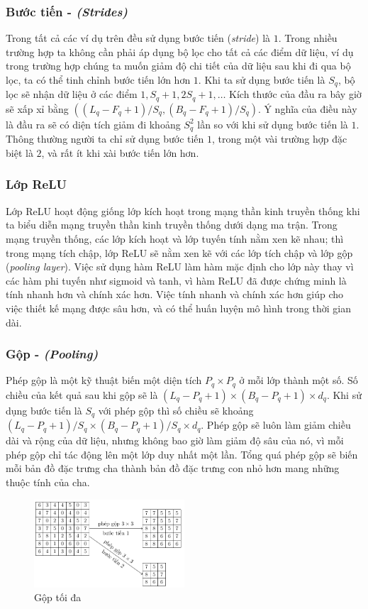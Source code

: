 \subsubsection{Bước tiến - \textit{(Strides)}}
Trong tất cả các ví dụ trên đều sử dụng bước tiến (\textit{stride}) là $1$. Trong nhiều trường hợp ta không cần phải áp dụng bộ lọc cho tất cả các điểm dữ liệu, ví dụ trong trường hợp chúng ta muốn giảm độ chi tiết của dữ liệu sau khi đi qua bộ lọc, ta có thể tinh chỉnh bước tiến lớn hơn $1$. Khi ta sử dụng bước tiến là $S_q$, bộ lọc sẽ nhận dữ liệu ở các điểm $1,S_q+1,2S_q+1,\dots$ Kích thước của đầu ra bây giờ sẽ xấp xỉ bằng $\left((L_q-F_q+1)/S_q,(B_q-F_q+1)/S_q\right)$. Ý nghĩa của điều này là đầu ra sẽ có diện tích giảm đi khoảng $S_q^2$ lần so với khi sử dụng bước tiến là $1$. Thông thường người ta chỉ sử dụng bước tiến $1$, trong một vài trường hợp đặc biệt là $2$, và rất ít khi xài bước tiến lớn hơn.

\subsubsection{Lớp ReLU}
Lớp ReLU hoạt động giống lớp kích hoạt trong mạng thần kinh truyền thống khi ta biểu diễn mạng truyền thần kinh truyền thống dưới dạng ma trận. Trong mạng truyền thống, các lớp kích hoạt và lớp tuyến tính nằm xen kẽ nhau; thì trong mạng tích chập, lớp ReLU sẽ nằm xen kẽ với các lớp tích chập và lớp gộp (\textit{pooling layer}). Việc sử dụng hàm ReLU làm hàm mặc định cho lớp này thay vì các hàm phi tuyến như sigmoid và tanh, vì hàm ReLU đã được chứng minh là tính nhanh hơn và chính xác hơn. Việc tính nhanh và chính xác hơn giúp cho việc thiết kế mạng được sâu hơn, và có thể huấn luyện mô hình trong thời gian dài.

\subsubsection{Gộp - \textit{(Pooling)}}
Phép gộp là một kỹ thuật biến một diện tích $P_q\times P_q$ ở mỗi lớp thành một số. Số chiều của kết quả sau khi gộp sẽ là $(L_q-P_q+1)\times (B_q-P_q+1)\times d_q$. Khi sử dụng bước tiến là $S_q$ với phép gộp thì số chiều sẽ khoảng $(L_q-P_q+1)/S_q\times (B_q-P_q+1)/S_q\times d_q$. Phép gộp sẽ luôn làm giảm chiều dài và rộng của dữ liệu, nhưng không bao giờ làm giảm độ sâu của nó, vì mỗi phép gộp chỉ tác động lên một lớp duy nhất một lần. Tổng quá phép gộp sẽ biến mỗi bản đồ đặc trưng cha thành bản đồ đặc trưng con nhỏ hơn mang những thuộc tính của cha.
\begin{figure}[htb]
    \centering
    \includegraphics[width=0.5\textwidth]{tikz_image/cnn_pooling.pdf}
    \caption[Gộp tối đa]{Gộp tối đa \cite{Aggarwal2023-zk}}
    \label{figure:cnn-pooling}
\end{figure}

